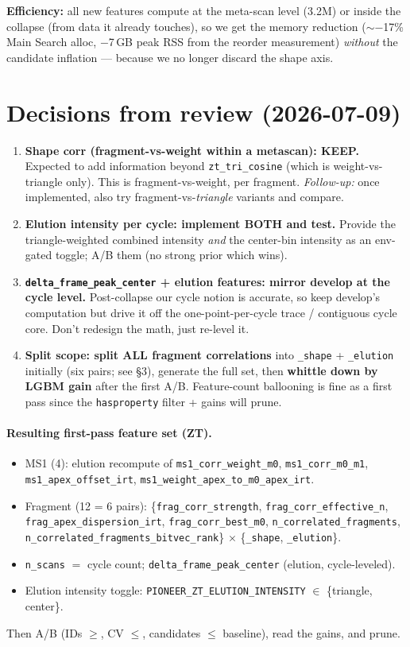 \documentclass[11pt]{article}
\newcommand{\code}[1]{\texttt{\small #1}}
\begin{document}
\textbf{Efficiency:} all new features compute at the meta-scan level (3.2M) or inside
the collapse (from data it already touches), so we get the memory reduction
($\sim$$-$17\% Main Search alloc, $-$7\,GB peak RSS from the reorder measurement)
\emph{without} the candidate inflation --- because we no longer discard the shape
axis.

\section{Decisions from review (2026-07-09)}

\begin{enumerate}
\item \textbf{Shape corr (fragment-vs-weight within a metascan): KEEP.} Expected to
add information beyond \code{zt\_tri\_cosine} (which is weight-vs-triangle only). This
is fragment-vs-weight, per fragment. \emph{Follow-up:} once implemented, also try
fragment-vs-\emph{triangle} variants and compare.
\item \textbf{Elution intensity per cycle: implement BOTH and test.} Provide the
triangle-weighted combined intensity \emph{and} the center-bin intensity as an
env-gated toggle; A/B them (no strong prior which wins).
\item \textbf{\code{delta\_frame\_peak\_center} + elution features: mirror develop at
the cycle level.} Post-collapse our cycle notion is accurate, so keep develop's
computation but drive it off the one-point-per-cycle trace / contiguous cycle core.
Don't redesign the math, just re-level it.
\item \textbf{Split scope: split ALL fragment correlations} into
\code{*\_shape} + \code{*\_elution} initially (six pairs; see §3), generate the full
set, then \textbf{whittle down by LGBM gain} after the first A/B. Feature-count
ballooning is fine as a first pass since the \code{hasproperty} filter + gains will
prune.
\end{enumerate}

\paragraph{Resulting first-pass feature set (ZT).}
\begin{itemize}
\item MS1 (4): elution recompute of \code{ms1\_corr\_weight\_m0},
\code{ms1\_corr\_m0\_m1}, \code{ms1\_apex\_offset\_irt},
\code{ms1\_weight\_apex\_to\_m0\_apex\_irt}.
\item Fragment (12 = 6 pairs): \{\code{frag\_corr\_strength},
\code{frag\_corr\_effective\_n}, \code{frag\_apex\_dispersion\_irt},
\code{frag\_corr\_best\_m0}, \code{n\_correlated\_fragments},
\code{n\_correlated\_fragments\_bitvec\_rank}\} $\times$ \{\code{\_shape},
\code{\_elution}\}.
\item \code{n\_scans} $=$ cycle count; \code{delta\_frame\_peak\_center} (elution,
cycle-leveled).
\item Elution intensity toggle: \code{PIONEER\_ZT\_ELUTION\_INTENSITY} $\in$
\{triangle, center\}.
\end{itemize}
Then A/B (IDs $\ge$, CV $\le$, candidates $\le$ baseline), read the gains, and prune.
\end{document}
